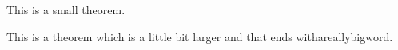 \documentclass[12pt, a4paper]{article}
\begin{document}
	\begin{thm}
		This is a small theorem.
	\end{thm}
	\begin{thm}
		This is a theorem which is a little bit larger and that ends withareallybigword.
	\end{thm}
\end{document}
